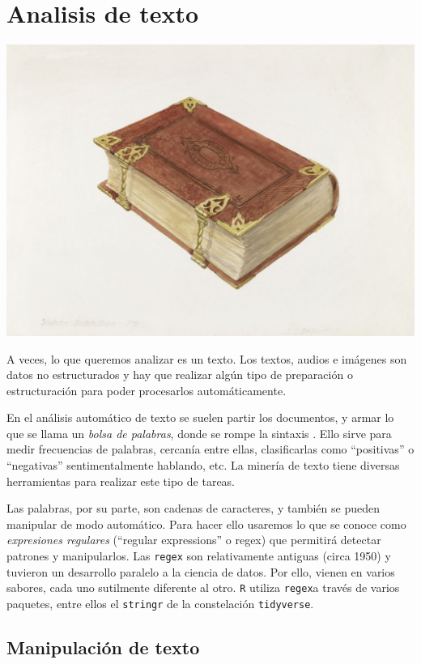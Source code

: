 \documentclass[
]{book}
\begin{document}
\hypertarget{analisis-de-texto}{%
\chapter{Analisis de texto}\label{analisis-de-texto}}

\includegraphics[width=1\linewidth]{imagenes/textos}

A veces, lo que queremos analizar es un texto. Los textos, audios e imágenes son datos no estructurados y hay que realizar algún tipo de preparación o estructuración para poder procesarlos automáticamente.

En el análisis automático de texto se suelen partir los documentos, y armar lo que se llama un \emph{bolsa de palabras}, donde se rompe la sintaxis . Ello sirve para medir frecuencias de palabras, cercanía entre ellas, clasificarlas como ``positivas'' o ``negativas'' sentimentalmente hablando, etc. La minería de texto tiene diversas herramientas para realizar este tipo de tareas.

Las palabras, por su parte, son cadenas de caracteres, y también se pueden manipular de modo automático. Para hacer ello usaremos lo que se conoce como \emph{expresiones regulares} (``regular expressions'' o regex) que permitirá detectar patrones y manipularlos. Las \texttt{regex} son relativamente antiguas (circa 1950) y tuvieron un desarrollo paralelo a la ciencia de datos. Por ello, vienen en varios sabores, cada uno sutilmente diferente al otro. \texttt{R} utiliza \texttt{regex}a través de varios paquetes, entre ellos el \texttt{stringr} de la constelación \texttt{tidyverse}.

\hypertarget{manipulaciuxf3n-de-texto}{%
\section{Manipulación de texto}\label{manipulaciuxf3n-de-texto}}
\end{document}
